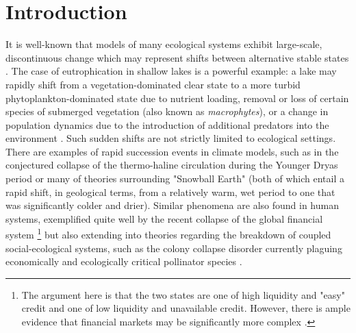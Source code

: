 \documentclass[12pt]{article}
\begin{document}
\section{Introduction}
It is well-known that models of many ecological systems exhibit large-scale, discontinuous change which may represent shifts between alternative stable states \cite{Holling1973}\cite{May1977}. The case of eutrophication in shallow lakes is a powerful example: a lake may rapidly shift from a vegetation-dominated clear state to a more turbid phytoplankton-dominated state due to nutrient loading, removal or loss of certain species of submerged vegetation (also known as \emph{macrophytes}), or a change in population dynamics due to the  introduction of additional predators into the environment \cite{Scheffer2009c}\cite{Wang2012}. Such sudden shifts are not strictly limited to ecological settings. There are examples of rapid succession events in climate models, such as in the conjectured collapse of the thermo-haline circulation during the Younger Dryas period \cite{Dakos2008} or many of theories surrounding "Snowball Earth" \cite{Scheffer2009c} (both of which entail a rapid shift, in geological terms, from a relatively warm, wet period to one that was significantly colder and drier). Similar phenomena are also found in human systems, exemplified quite well by the recent collapse of the global financial system
	\footnote{The argument here is that the two states are one of high liquidity and "easy" credit and one of low liquidity and unavailable credit. However, there is ample evidence 
	that financial markets may be significantly more complex \cite{Hsieh1991}\cite{Johansen2000}.} \cite{Haldane2011}
but also extending into theories regarding the breakdown of coupled social-ecological systems, such as the colony collapse disorder currently plaguing economically and ecologically critical pollinator species \cite{JelleLever2014}.\\
\end{document}
